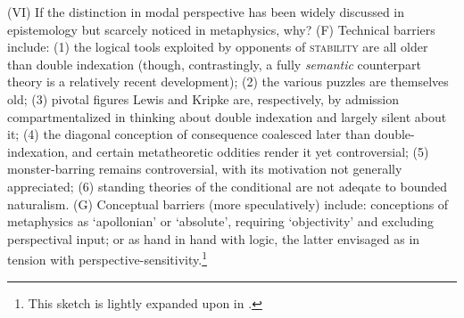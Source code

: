 \documentclass[12pt]{article}
\begin{document}
\begin{comment}
Rather than \emph{ad hoc}, this postsemantic analysis is independently
motivated. First, incorporating Kamp's tensed, rigidifying language within a
proppositional pragmatic theory requires a postsemantic operation on semantic
values to convert (bindable) \emph{indexical} temporal arguments to
(saturable) \emph{contextual} arguments (the lesson of Lewis's discrimination
of Kaplanean characters from compositional semantic values). Second,
Williamson's invocation of the `universal rigidifier' $\Act$ is to collapse
the indicative \emph{if} to the material conditional: interrupting the
argument apparently requires excluding the operand of an \emph{if}-clause from
those `environments' $\Epsilon$ available for rigidification; the
extraordinary `hole-punching' behavior posited motivates this exclusion.
Third, a postsemantic approach assembling these threads improves, along both
conceptual and technical lines, the most adequate standing proposal (McGee's
2D `sentence storage' theory) for interrupting a further, widely discussed
`multiple antecedent' collapse due to Gibbard.\footnote{For postsemantics:
\citep[pp.~39--42]{lewis80icc}; and
\citep{rabern12,Rabern2017-BRIABF-2,yli13}. Williamson collapse:
\citep{williamson09ca,Williamson2020-WILSAT-35}; opposition:
\citep{stalnaker14}. Gibbard collapse:
\citep{gibbard81,fitelson13,khoo-mandelkern}; storage:
\citep{mcgee85,mandelkern-if-and}.}
\end{comment}

\smallskip{}

(VI) If the distinction in modal perspective has been widely discussed in
epistemology but scarcely noticed in metaphysics, why? (F) Technical barriers
include: (1) the logical tools exploited by opponents of \textsc{stability}
are all older than double indexation (though, contrastingly, a fully
\emph{semantic} counterpart theory is a relatively recent development); (2) the
various puzzles are themselves old; (3) pivotal figures Lewis and Kripke are,
respectively, by admission compartmentalized in thinking about double
indexation and largely silent about it; (4) the diagonal conception of
consequence coalesced later than double-indexation, and certain metatheoretic
oddities render it yet controversial; (5) monster-barring remains
controversial, with its motivation not generally appreciated; (6) standing
theories of the conditional are not adeqate to bounded naturalism. (G)
Conceptual barriers (more speculatively) include: conceptions of metaphysics
as `apollonian' or `absolute', requiring
`objectivity' and excluding perspectival input; or as hand in hand with logic,
the latter envisaged as in tension with perspective-sensitivity.\footnote{This
sketch is lightly expanded upon in \citep[sec.~5]{hmw}.}






\eject




%
%
\end{document}

